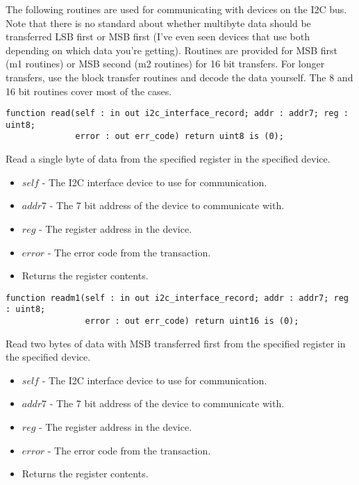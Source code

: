 \documentclass[10pt, openany]{book}
\newcommand{\indexfunc}[1]{\index[func]{#1}}
\begin{document}
The following routines are used for communicating with devices on the I2C bus.  Note that there is no standard about whether multibyte data should be transferred LSB first or MSB first (I've even seen devices that use both depending on which data you're getting).  Routines are provided for MSB first (m1 routines) or MSB second (m2 routines) for 16 bit transfers.  For longer transfers, use the block transfer routines and decode the data yourself.  The 8 and 16 bit routines cover most of the cases.
\begin{lstlisting}
function read(self : in out i2c_interface_record; addr : addr7; reg : uint8;
              error : out err_code) return uint8 is (0);
\end{lstlisting}
\indexfunc{read}
Read a single byte of data from the specified register in the specified device.
\begin{itemize}
  \item $self$ - The I2C interface device to use for communication.
  \item $addr7$ - The 7 bit address of the device to communicate with.
  \item $reg$ - The register address in the device.
  \item $error$ - The error code from the transaction.
  \item Returns the register contents.
\end{itemize}

\begin{lstlisting}
function readm1(self : in out i2c_interface_record; addr : addr7; reg : uint8;
                error : out err_code) return uint16 is (0);
\end{lstlisting}
\indexfunc{readm1}
Read two bytes of data with MSB transferred first from the specified register in the specified device.
\begin{itemize}
  \item $self$ - The I2C interface device to use for communication.
  \item $addr7$ - The 7 bit address of the device to communicate with.
  \item $reg$ - The register address in the device.
  \item $error$ - The error code from the transaction.
  \item Returns the register contents.
\end{itemize}
\end{document}
